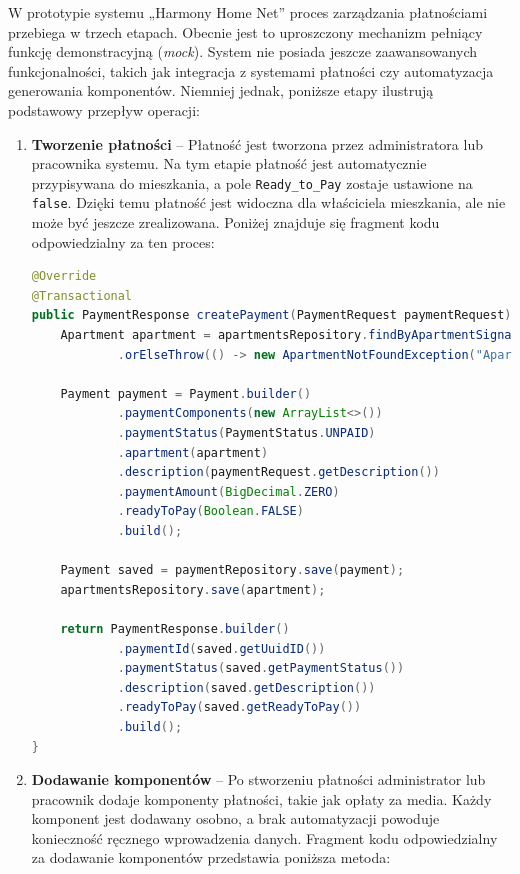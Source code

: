 W prototypie systemu „Harmony Home Net” proces zarządzania płatnościami przebiega w trzech etapach. Obecnie jest to uproszczony mechanizm pełniący funkcję demonstracyjną (\emph{mock}). System nie posiada jeszcze zaawansowanych funkcjonalności, takich jak integracja z systemami płatności czy automatyzacja generowania komponentów. Niemniej jednak, poniższe etapy ilustrują podstawowy przepływ operacji:

\begin{enumerate}
    \item \textbf{Tworzenie płatności} -- Płatność jest tworzona przez administratora lub pracownika systemu. Na tym etapie płatność jest automatycznie przypisywana do mieszkania, a pole \texttt{Ready\_to\_Pay} zostaje ustawione na \texttt{false}. Dzięki temu płatność jest widoczna dla właściciela mieszkania, ale nie może być jeszcze zrealizowana. Poniżej znajduje się fragment kodu odpowiedzialny za ten proces:

\begin{lstlisting}[language=Java, style=JavaStyle, caption=Fragment metody \texttt{createPayment}]
@Override
@Transactional
public PaymentResponse createPayment(PaymentRequest paymentRequest) throws ApartmentNotFoundException {
    Apartment apartment = apartmentsRepository.findByApartmentSignature(paymentRequest.getApartmentSignature())
            .orElseThrow(() -> new ApartmentNotFoundException("Apartment: " + paymentRequest.getApartmentSignature() + " not found"));

    Payment payment = Payment.builder()
            .paymentComponents(new ArrayList<>())
            .paymentStatus(PaymentStatus.UNPAID)
            .apartment(apartment)
            .description(paymentRequest.getDescription())
            .paymentAmount(BigDecimal.ZERO)
            .readyToPay(Boolean.FALSE)
            .build();

    Payment saved = paymentRepository.save(payment);
    apartmentsRepository.save(apartment);

    return PaymentResponse.builder()
            .paymentId(saved.getUuidID())
            .paymentStatus(saved.getPaymentStatus())
            .description(saved.getDescription())
            .readyToPay(saved.getReadyToPay())
            .build();
}
\end{lstlisting}

    \item \textbf{Dodawanie komponentów} -- Po stworzeniu płatności administrator lub pracownik dodaje komponenty płatności, takie jak opłaty za media. Każdy komponent jest dodawany osobno, a brak automatyzacji powoduje konieczność ręcznego wprowadzenia danych. Fragment kodu odpowiedzialny za dodawanie komponentów przedstawia poniższa metoda:


\end{enumerate}
